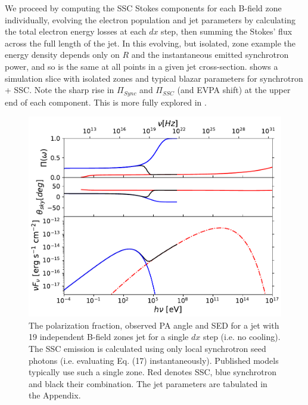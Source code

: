 We proceed by computing the SSC Stokes components for each B-field zone individually, evolving the electron population and jet parameters by calculating the total electron energy losses at each $dx$ step, then summing the Stokes' flux across the full length of the jet. In this evolving, but isolated, zone example the energy density depends only on $R$ and the instantaneous emitted synchrotron power, and so is the same at all points in a given jet cross-section.  shows a simulation slice with isolated zones and typical blazar parameters for synchrotron + SSC. Note the sharp rise in $\Pi_{Sync}$ and $\Pi_{SSC}$ (and EVPA shift) at the upper end of each component. This is more fully explored in .

\begin{figure}[t]
\includegraphics[width=0.8\linewidth]{figures/Figure2.pdf}
\centering
\caption{The polarization fraction, observed PA angle and SED for a jet with 19 independent B-field zones jet for a single $dx$ step (i.e. no cooling). The SSC emission is calculated using only local synchrotron seed photons (i.e. evaluating Eq. (17) instantaneously). Published models typically use such a single zone. Red denotes SSC, blue synchrotron and black their combination. The jet parameters are tabulated in the Appendix.
}
\label{fig:ssc2}
\end{figure}

